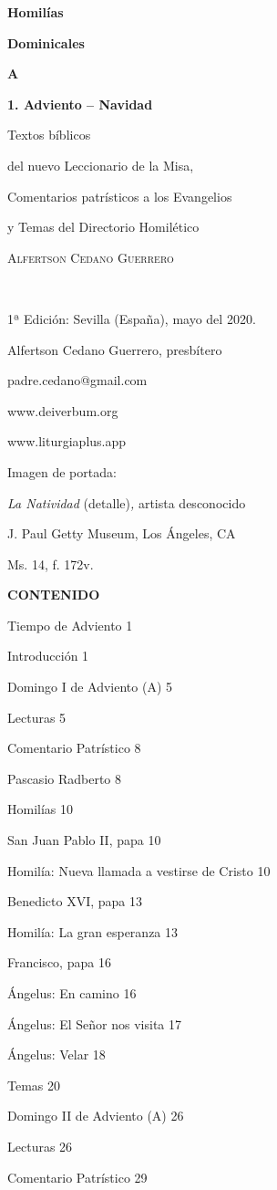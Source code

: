 \documentclass[]{article}
\date{}
\begin{document}
\textbf{Homilías}

\textbf{Dominicales}

\textbf{A}

\textbf{1. Adviento -- Navidad}

Textos bíblicos

del nuevo Leccionario de la Misa,

Comentarios patrísticos a los Evangelios

y Temas del Directorio Homilético

\textsc{Alfertson Cedano Guerrero}

\textsc{\\
}

1ª Edición: Sevilla (España), mayo del 2020.

Alfertson Cedano Guerrero, presbítero

padre.cedano@gmail.com

www.deiverbum.org

www.liturgiaplus.app

Imagen de portada:

\emph{La Natividad} (detalle)\emph{,} artista desconocido

J. Paul Getty Museum, Los Ángeles, CA

Ms. 14, f. 172v.

\textbf{CONTENIDO}

Tiempo de Adviento 1

Introducción 1

Domingo I de Adviento (A) 5

Lecturas 5

Comentario Patrístico 8

Pascasio Radberto 8

Homilías 10

San Juan Pablo II, papa 10

Homilía: Nueva llamada a vestirse de Cristo 10

Benedicto XVI, papa 13

Homilía: La gran esperanza 13

Francisco, papa 16

Ángelus: En camino 16

Ángelus: El Señor nos visita 17

Ángelus: Velar 18

Temas 20

Domingo II de Adviento (A) 26

Lecturas 26

Comentario Patrístico 29
\end{document}
